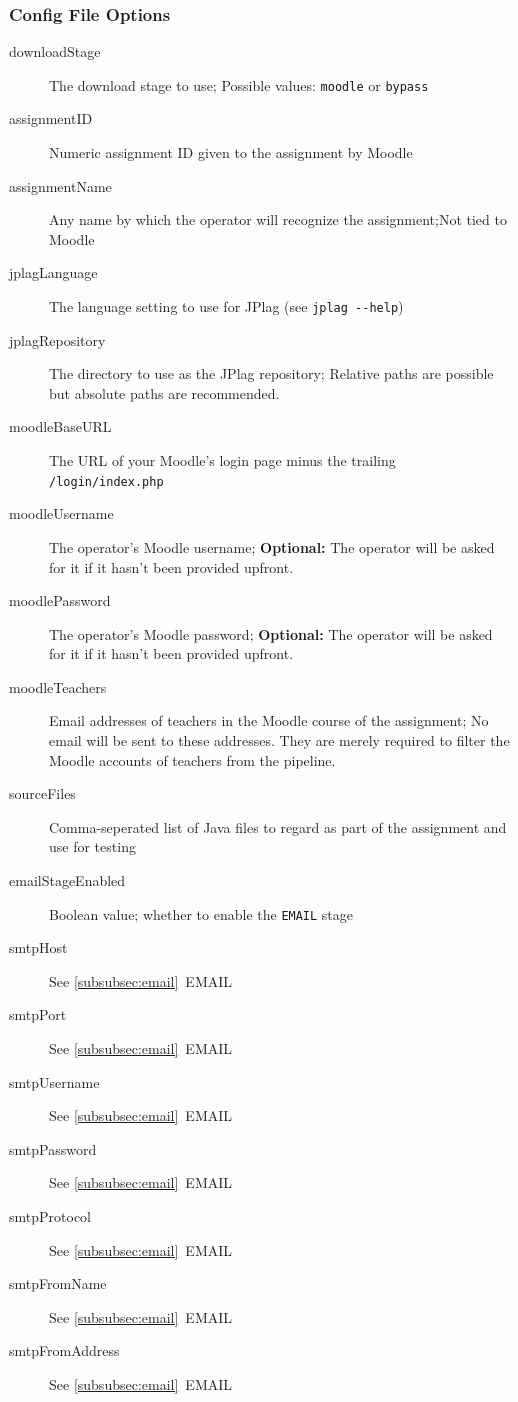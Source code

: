 \documentclass[12pt,a4paper,oneside]{report}
\begin{document}
	\subsubsection{Config File Options}

	\begin{description}
		\item[downloadStage] The download stage to use; Possible values: \lstinline|moodle| or \lstinline|bypass|
		\item[assignmentID] Numeric assignment ID given to the assignment by Moodle
		\item[assignmentName] Any name by which the operator will recognize the assignment;\linebreak{}Not tied to Moodle
		\item[jplagLanguage] The language setting to use for JPlag (see \lstinline|jplag --help|)
		\item[jplagRepository] The directory to use as the JPlag repository; Relative paths are possible but absolute paths are recommended.
		\item[moodleBaseURL] The URL of your Moodle's login page minus the trailing \lstinline|/login/index.php|
		\item[moodleUsername] The operator's Moodle username; \textbf{Optional:} The operator will be asked for it if it hasn't been provided upfront.
		\item[moodlePassword] The operator's Moodle password; \textbf{Optional:} The operator will be asked for it if it hasn't been provided upfront.
		\item[moodleTeachers] Email addresses of teachers in the Moodle course of the assignment; No email will be sent to these addresses. They are merely required to filter the Moodle accounts of teachers from the pipeline.
		\item[sourceFiles] Comma-seperated list of Java files to regard as part of the assignment and use for testing
		\item[emailStageEnabled] Boolean value; whether to enable the \lstinline|EMAIL| stage
		\item[smtpHost] See \ref{subsubsec:email}~EMAIL
		\item[smtpPort] See \ref{subsubsec:email}~EMAIL
		\item[smtpUsername] See \ref{subsubsec:email}~EMAIL
		\item[smtpPassword] See \ref{subsubsec:email}~EMAIL
		\item[smtpProtocol] See \ref{subsubsec:email}~EMAIL
		\item[smtpFromName] See \ref{subsubsec:email}~EMAIL
		\item[smtpFromAddress] See \ref{subsubsec:email}~EMAIL

	\end{description}
\end{document}

